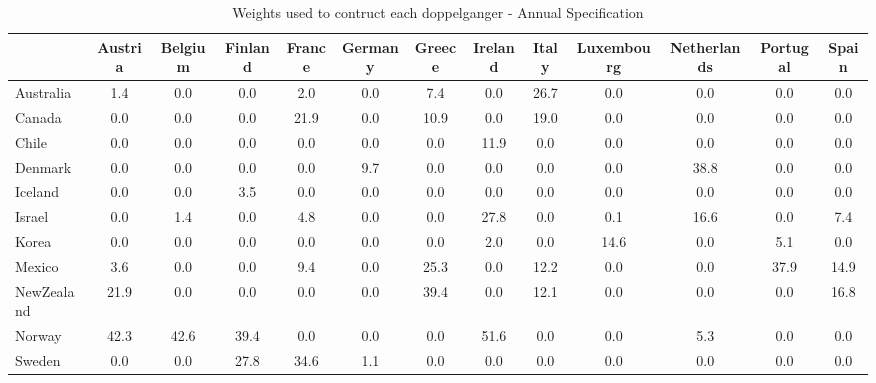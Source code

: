 \begin{table}[htbp]
\caption{\label{clabel} Weights used to contruct each doppelganger - Annual Specification}\centering\medskip
\begin{tabular}{lcccccccccccc} \hline \hline
 & Austria  & Belgium  & Finland  & France  & Germany  & Greece  & Ireland  & Italy  & Luxembourg  & Netherlands  & Portugal  & Spain  \\  \hline 
Australia &       1.4 &       0.0 &       0.0 &       2.0 &       0.0 &       7.4 &       0.0 &      26.7 &       0.0 &       0.0 &       0.0 &       0.0 \\  
Canada &       0.0 &       0.0 &       0.0 &      21.9 &       0.0 &      10.9 &       0.0 &      19.0 &       0.0 &       0.0 &       0.0 &       0.0 \\  
Chile &       0.0 &       0.0 &       0.0 &       0.0 &       0.0 &       0.0 &      11.9 &       0.0 &       0.0 &       0.0 &       0.0 &       0.0 \\  
Denmark &       0.0 &       0.0 &       0.0 &       0.0 &       9.7 &       0.0 &       0.0 &       0.0 &       0.0 &      38.8 &       0.0 &       0.0 \\  
Iceland &       0.0 &       0.0 &       3.5 &       0.0 &       0.0 &       0.0 &       0.0 &       0.0 &       0.0 &       0.0 &       0.0 &       0.0 \\  
Israel &       0.0 &       1.4 &       0.0 &       4.8 &       0.0 &       0.0 &      27.8 &       0.0 &       0.1 &      16.6 &       0.0 &       7.4 \\  
Korea &       0.0 &       0.0 &       0.0 &       0.0 &       0.0 &       0.0 &       2.0 &       0.0 &      14.6 &       0.0 &       5.1 &       0.0 \\  
Mexico &       3.6 &       0.0 &       0.0 &       9.4 &       0.0 &      25.3 &       0.0 &      12.2 &       0.0 &       0.0 &      37.9 &      14.9 \\  
NewZealand &      21.9 &       0.0 &       0.0 &       0.0 &       0.0 &      39.4 &       0.0 &      12.1 &       0.0 &       0.0 &       0.0 &      16.8 \\  
Norway &      42.3 &      42.6 &      39.4 &       0.0 &       0.0 &       0.0 &      51.6 &       0.0 &       0.0 &       5.3 &       0.0 &       0.0 \\  
Sweden &       0.0 &       0.0 &      27.8 &      34.6 &       1.1 &       0.0 &       0.0 &       0.0 &       0.0 &       0.0 &       0.0 &       0.0 \\  

\end{tabular}
\end{table}
